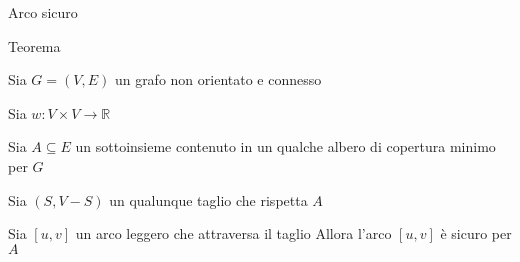 \begin{frame}{Arco sicuro}

\begin{block}{Teorema}	
\BIL
\item Sia $G=(V,E)$ un grafo non orientato e connesso 
\item Sia $w: V \times V \rightarrow \mathbb{R}$
\item Sia $A \subseteq E$ un sottoinsieme contenuto in un qualche albero di copertura minimo per $G$ 
\item Sia $(S,V-S)$ un qualunque taglio che rispetta $A$
\item Sia $[u,v]$ un arco leggero che attraversa il taglio
\EIL
Allora  l'arco $[u,v]$ è sicuro per $A$	
\end{block}
\end{frame}


